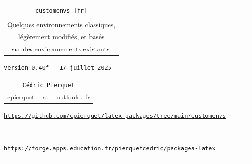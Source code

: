 \documentclass[french,11pt,a4paper]{article}
\def\TPversion{0.40f}
\def\TPdate{17 juillet 2025}
\begin{document}
\pagestyle{fancy}

\thispagestyle{empty}

\begin{center}
	\begin{minipage}{0.75\linewidth}
	\begin{tcolorbox}[colframe=yellow,colback=yellow!15]
		\begin{center}
			\renewcommand\arraystretch{1.25}
			\begin{tabular}{c}
				{\Huge \texttt{customenvs [fr]}}\\
				\\
				{\Large Quelques environnements classiques,} \\
				{\Large légèrement modifiés, et basés} \\
				{\Large sur des environnements existants.} \\
			\end{tabular}
			\renewcommand\arraystretch{1}
			
			\medskip
			
			{\small \texttt{Version \TPversion{} -- \TPdate}}
		\end{center}
	\end{tcolorbox}
\end{minipage}
\end{center}

\begin{center}
	\begin{tabular}{c}
		\texttt{Cédric Pierquet}\\
		{\ttfamily cpierquet -- at -- outlook . fr}
	\end{tabular}
\end{center}

\begin{center}
\begin{minipage}{0.85\linewidth}
	\begin{tcolorbox}[colframe=teal,colback=teal!10,halign=center,fontupper=\footnotesize]
		\texttt{\url{https://github.com/cpierquet/latex-packages/tree/main/customenvs}}
		
		~
		
		\texttt{\url{https://forge.apps.education.fr/pierquetcedric/packages-latex}}
	\end{tcolorbox}
\end{minipage}
\end{center}

\vspace*{5mm}

\hrule
\end{document}
